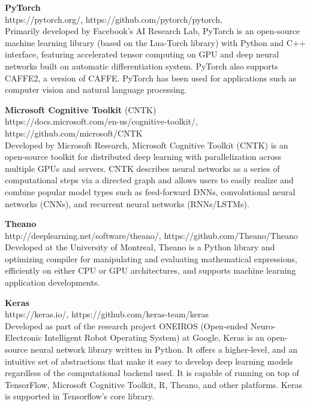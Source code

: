 \noindent\textbf{PyTorch} \\https://pytorch.org/, https://github.com/pytorch/pytorch, \\Primarily developed by Facebook's AI Research Lab, PyTorch is an open-source machine learning library (based on the Lua-Torch library) with Python and C++ interface, featuring accelerated tensor computing on GPU and deep neural networks built on automatic differentiation system. PyTorch also supports CAFFE2, a version of CAFFE. PyTorch has been used for applications such as computer vision and natural language processing. 
\newline

\noindent\textbf{Microsoft Cognitive Toolkit} (CNTK) \\https://docs.microsoft.com/en-us/cognitive-toolkit/, https://github.com/microsoft/CNTK \\Developed by Microsoft Research, Microsoft Cognitive Toolkit (CNTK) is an open-source toolkit for distributed deep learning with parallelization across multiple GPUs and servers. CNTK describes neural networks as a series of computational steps via a directed graph and allows users to easily realize and combine popular model types such as feed-forward DNNs, convolutional neural networks (CNNs), and recurrent neural networks (RNNs/LSTMs).
\newline

\noindent\textbf{Theano} \\http://deeplearning.net/software/theano/, https://github.com/Theano/Theano \\Developed at the University of Montreal, Theano is a Python library and optimizing compiler for manipulating and evaluating mathematical expressions, efficiently on either CPU or GPU architectures, and supports machine learning application developments. 
\newline

\noindent\textbf{Keras} \\https://keras.io/, https://github.com/keras-team/keras \\Developed as part of the research project ONEIROS (Open-ended Neuro-Electronic Intelligent Robot Operating System) at Google, Keras is an open-source neural network library written in Python. It offers a higher-level, and an intuitive set of abstractions that make it easy to develop deep learning models regardless of the computational backend used. It is capable of running on top of TensorFlow, Microsoft Cognitive Toolkit, R, Theano, and other platforms. Keras is supported in Tensorflow's core library. 
\newline

